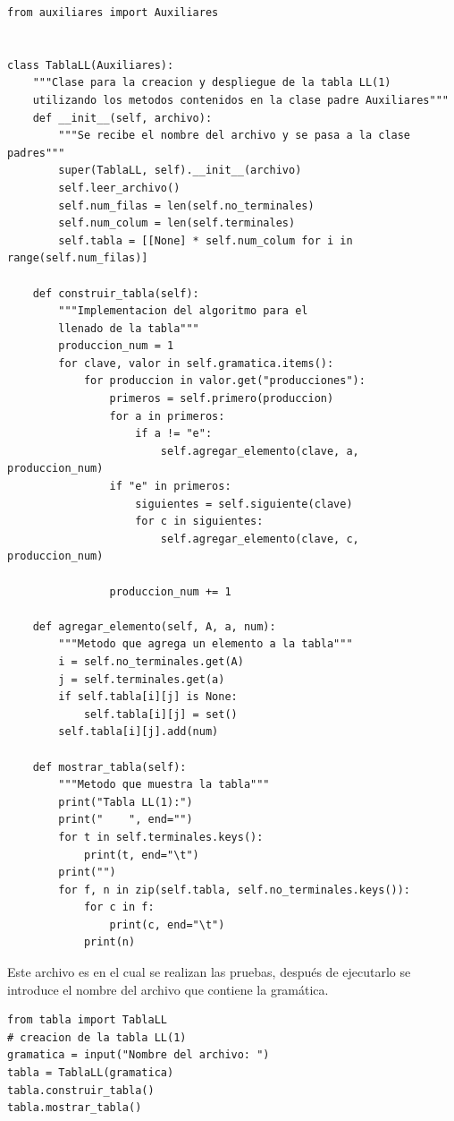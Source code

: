 \documentclass[12pt, titlepage]{article}
\begin{document}
    \begin{lstlisting}[title=Archivo: tabla.py]
from auxiliares import Auxiliares


class TablaLL(Auxiliares):
    """Clase para la creacion y despliegue de la tabla LL(1)
    utilizando los metodos contenidos en la clase padre Auxiliares"""
    def __init__(self, archivo):
        """Se recibe el nombre del archivo y se pasa a la clase padres"""
        super(TablaLL, self).__init__(archivo)
        self.leer_archivo()
        self.num_filas = len(self.no_terminales)
        self.num_colum = len(self.terminales)
        self.tabla = [[None] * self.num_colum for i in range(self.num_filas)]

    def construir_tabla(self):
        """Implementacion del algoritmo para el
        llenado de la tabla"""
        produccion_num = 1
        for clave, valor in self.gramatica.items():
            for produccion in valor.get("producciones"):
                primeros = self.primero(produccion)
                for a in primeros:
                    if a != "e":
                        self.agregar_elemento(clave, a, produccion_num)
                if "e" in primeros:
                    siguientes = self.siguiente(clave)
                    for c in siguientes:
                        self.agregar_elemento(clave, c, produccion_num)

                produccion_num += 1

    def agregar_elemento(self, A, a, num):
        """Metodo que agrega un elemento a la tabla"""
        i = self.no_terminales.get(A)
        j = self.terminales.get(a)
        if self.tabla[i][j] is None:
            self.tabla[i][j] = set()
        self.tabla[i][j].add(num)

    def mostrar_tabla(self):
        """Metodo que muestra la tabla"""
        print("Tabla LL(1):")
        print("    ", end="")
        for t in self.terminales.keys():
            print(t, end="\t")
        print("")
        for f, n in zip(self.tabla, self.no_terminales.keys()):
            for c in f:
                print(c, end="\t")
            print(n)
    \end{lstlisting}
    Este archivo es en el cual se realizan las pruebas, después de ejecutarlo 
se introduce el nombre del archivo que contiene la gramática.
    \begin{lstlisting}[title=Archivo: prueba.py]
from tabla import TablaLL
# creacion de la tabla LL(1)
gramatica = input("Nombre del archivo: ")
tabla = TablaLL(gramatica)
tabla.construir_tabla()
tabla.mostrar_tabla()
    \end{lstlisting}
\end{document}
